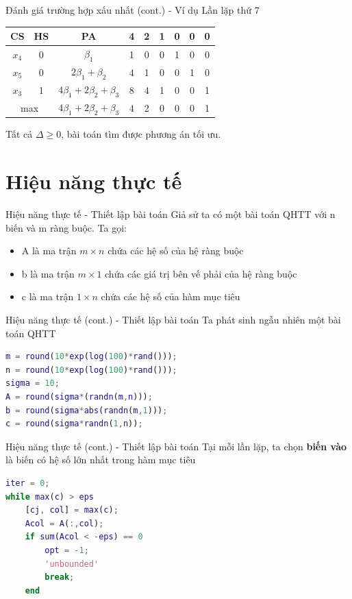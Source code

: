 \documentclass[10pt]{beamer}
\begin{document}
\begin{frame}{Đánh giá trường hợp xấu nhất (cont.) - Ví dụ}
Lần lặp thứ 7
\begin{table}[H]
\centering
\begin{tabular}{|c|c|c|c|c|c|c|c|c|}
\hline
CS & HS & PA & 4 & 2 & 1 & 0 & 0 & 0 \\
\hline
$x_4$ & 0 & $\beta_1$ & 1 & 0 & 0 & 1 & 0 & 0 \\
$x_5$ & 0 & $2\beta_1 + \beta_2$ & 4 & 1 & 0 & 0 & 1 & 0 \\
$x_3$ & 1 & $4\beta_1 + 2\beta_2 + \beta_3$ & 8 & 4 & 1 & 0 & 0 & 1 \\
\hline
\multicolumn{2}{|c|}{max}
&  $4\beta_1 + 2\beta_2 + \beta_3$  & 4 & 2 & 0 & 0 & 0 & 1 \\
\hline
\end{tabular}
\end{table}
Tất cả $\Delta \ge 0$, bài toán tìm được phương án tối ưu.
\end{frame}


\section{Hiệu năng thực tế}
\begin{frame}{Hiệu năng thực tế - Thiết lập bài toán}
Giả sử ta có một bài toán QHTT với n biến và m ràng buộc. Ta gọi:
\begin{itemize}
\item A là ma trận $m\times n$ chứa các hệ số của hệ ràng buộc
\item b là ma trận $m\times 1$ chứa các giá trị bên vế phải của hệ ràng buộc
\item c là ma trận $1\times n$ chứa các hệ số của hàm mục tiêu
\end{itemize}
\end{frame}

\begin{frame}[fragile]{Hiệu năng thực tế (cont.) - Thiết lập bài toán}
Ta phát sinh ngẫu nhiên một bài toán QHTT
\begin{lstlisting}[language=Matlab]
m = round(10*exp(log(100)*rand()));
n = round(10*exp(log(100)*rand()));
sigma = 10;
A = round(sigma*(randn(m,n)));
b = round(sigma*abs(randn(m,1)));
c = round(sigma*randn(1,n));
\end{lstlisting}
\end{frame}

\begin{frame}[fragile]{Hiệu năng thực tế (cont.) - Thiết lập bài toán}
Tại mỗi lần lặp, ta chọn \textbf{biến vào} là biến có hệ số lớn nhất trong hàm mục tiêu
\begin{lstlisting}[language=Matlab]
iter = 0;
while max(c) > eps
    [cj, col] = max(c);
    Acol = A(:,col);
    if sum(Acol < -eps) == 0
        opt = -1;
        'unbounded'
        break;
    end
\end{lstlisting}
\end{frame}
\end{document}

